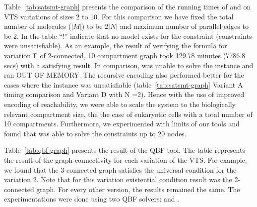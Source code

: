 %
Table~\ref{tab:satsmt-graph} presents the comparison of the running times of {\smttool} and {\sattool} on VTS variations of sizes 2 to 10.
%
For this comparison we have fixed the total number of molecules ($|M|$) to be $2|N|$ 
%
and maximum number of parallel
edges to be 2.
%
%
In the table ``!'' indicate that no model exists for the constraint  (constraints were unsatisfiable).
%
%
As an example, the result of verifying the formula for variation F of 2-connected, 10 compartment graph took 129.78 minutes (7786.8 secs) with a satisfying result.
%
In comparison, {\sattool} was unable to solve the instance and ran OUT OF MEMORY.
%
% 
The recursive encoding also performed better for the cases where the instance was unsatisfiable (table~\ref{tab:satsmt-graph} Variant A timing comparison and Variant D with N =2).
%
Hence with the use of improved encoding of reachability, we were able to scale the system to the biologically relevant compartment size, the
the case of eukaryotic cells with a total number of 10 compartments.
%
Furthermore, we experimented with limits of our tools and found that {\smttool} was able to solve the constraints up to $20$ nodes.


Table~\ref{tab:qbf-graph} presents the result of the QBF tool.
%
The table represents the result of the graph connectivity for each variation of the VTS.  
%
For example, we found that the 3-connected graph satisfies the universal condition for the variation 2. 
%
Note that for this variation existential condition result was the 2-connected graph. 
%
For every other version, the results remained the same.
% 
The experimentations were done using two QBF solvers: \depqbf and \rarqbf.

